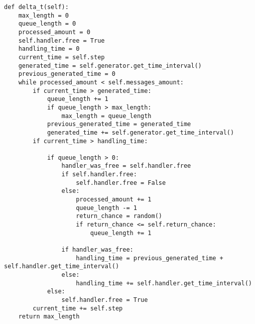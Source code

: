 \begin{center}
\captionsetup{justification=raggedright,singlelinecheck=off}
\begin{lstlisting}[label=lst:delta-t,caption=Реализация управляющей программы принципа $\Delta t$]
def delta_t(self):
    max_length = 0
    queue_length = 0
    processed_amount = 0
    self.handler.free = True
    handling_time = 0
    current_time = self.step
    generated_time = self.generator.get_time_interval()
    previous_generated_time = 0
    while processed_amount < self.messages_amount:
        if current_time > generated_time:
            queue_length += 1
            if queue_length > max_length:
                max_length = queue_length
            previous_generated_time = generated_time
            generated_time += self.generator.get_time_interval()
        if current_time > handling_time:

            if queue_length > 0:
                handler_was_free = self.handler.free
                if self.handler.free:
                    self.handler.free = False
                else:
                    processed_amount += 1
                    queue_length -= 1
                    return_chance = random()
                    if return_chance <= self.return_chance:
                        queue_length += 1

                if handler_was_free:
                    handling_time = previous_generated_time + self.handler.get_time_interval()
                else:
                    handling_time += self.handler.get_time_interval()
            else:
                self.handler.free = True
        current_time += self.step
    return max_length
\end{lstlisting}
\end{center}

